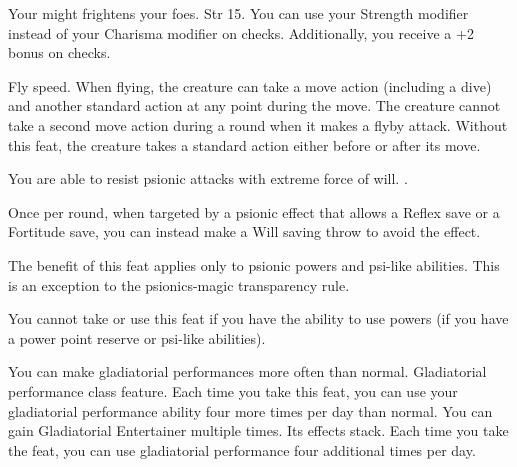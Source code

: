 {Your might frightens your foes.}
{Str 15.}
{You can use your Strength modifier instead of your Charisma modifier on  checks. Additionally, you receive a +2 bonus on  checks.}{}{}

{}
{Fly speed.}
{When flying, the creature can take a move action (including a dive) and another standard action at any point during the move. The creature cannot take a second move action during a round when it makes a flyby attack.}
{Without this feat, the creature takes a standard action either before or after its move.}
{}

{You are able to resist psionic attacks with extreme force of will.}
{.}
{Once per round, when targeted by a psionic effect that allows a Reflex save or a Fortitude save, you can instead make a Will saving throw to avoid the effect.

The benefit of this feat applies only to psionic powers and psi-like abilities. This is an exception to the psionics-magic transparency rule.}{}
{You cannot take or use this feat if you have the ability to use powers (if you have a power point reserve or psi-like abilities).}

{You can make gladiatorial performances more often than normal.}
{Gladiatorial performance class feature.}
{Each time you take this feat, you can use your gladiatorial performance ability four more times per day than normal.}
{}
{You can gain Gladiatorial Entertainer multiple times. Its effects stack. Each time you take the feat, you can use gladiatorial performance four additional times per day.}

